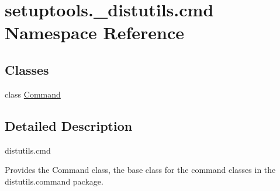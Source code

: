 \hypertarget{namespacesetuptools_1_1__distutils_1_1cmd}{}\section{setuptools.\+\_\+distutils.\+cmd Namespace Reference}
\label{namespacesetuptools_1_1__distutils_1_1cmd}
\subsection*{Classes}
\begin{DoxyCompactItemize}
\item 
class \hyperlink{classsetuptools_1_1__distutils_1_1cmd_1_1Command}{Command}
\end{DoxyCompactItemize}


\subsection{Detailed Description}
\begin{DoxyVerb}distutils.cmd

Provides the Command class, the base class for the command classes
in the distutils.command package.
\end{DoxyVerb}
 